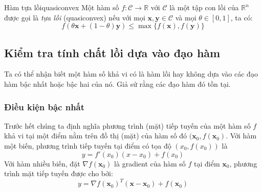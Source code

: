 \begin{mydef}{Hàm tựa lồi}{quasiconvex}
Một hàm số $f: \mathcal{C} \rightarrow \mathbb{R}$ với $\mathcal{C}$ là một tập con {lồi} của $\mathbb{R}^n$ được gọi là \textit{tựa lồi} (quasiconvex) nếu với mọi $\mathbf{x}, \mathbf{y} \in \mathcal{C}$ và mọi $\theta \in [0, 1]$, ta có:
\begin{equation*}
f(\theta\mathbf{x} + (1 - \theta)\mathbf{y}) \leq \max\{f(\mathbf{x}), f(\mathbf{y})\}
\end{equation*}
\end{mydef}



\subsection{Kiểm tra tính chất lồi dựa vào đạo hàm}
Ta có thể nhận biết một hàm số khả vi có là hàm lồi hay không dựa vào các
đạo hàm bậc nhất hoặc bậc hai của nó. Giả sử rằng các
đạo hàm đó tồn tại.

\subsubsection{Điều kiện bậc nhất}

Trước hết chúng ta định nghĩa phương trình (mặt) tiếp tuyến của một hàm số
$f$ khả vi tại một điểm nằm trên đồ thị (mặt) của hàm số đó $(\mathbf{x}_0,
f(\mathbf{x}_0)$. Với hàm một biến, phương trình tiếp tuyến tại điểm có tọa độ
$(x_0, f(x_0))$ là
\begin{equation*}
y = f'(x_0)(x - x_0) + f(x_0)
\end{equation*}
Với hàm nhiều biến, đặt $\nabla f(\mathbf{x}_0)$ là gradient của hàm số $f$ tại điểm $\mathbf{x}_0$, phương trình mặt tiếp tuyến được cho bởi:
\begin{equation*}
y = \nabla f(\mathbf{x}_0)^T (\mathbf{x} - \mathbf{x}_0) + f(\mathbf{x}_0)
\end{equation*}




